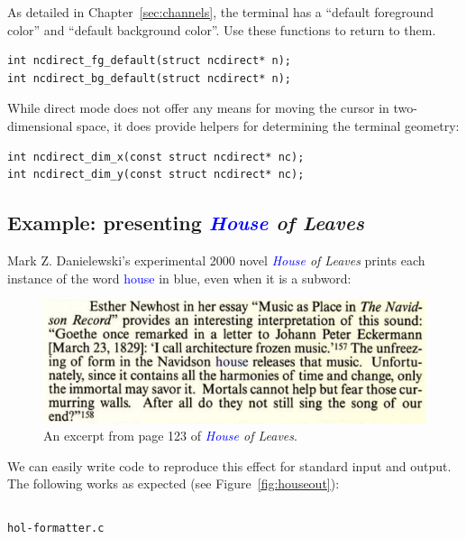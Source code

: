 \documentclass[letterpaper,10pt]{article}
\begin{document}
As detailed in Chapter~\ref{sec:channels}, the terminal has a ``default foreground color''
and ``default background color''. Use these functions to return to them.

\begin{listing}[!htbp]
\begin{verbatim}
int ncdirect_fg_default(struct ncdirect* n);
int ncdirect_bg_default(struct ncdirect* n);
\end{verbatim}
\end{listing}

While direct mode does not offer any means for moving the cursor in
two-dimensional space, it does provide helpers for determining the terminal
geometry:

\begin{listing}[!htbp]
\begin{verbatim}
int ncdirect_dim_x(const struct ncdirect* nc);
int ncdirect_dim_y(const struct ncdirect* nc);
\end{verbatim}
\end{listing}

\subsection{Example: presenting \textit{\textcolor{blue}{House} of Leaves}}

Mark Z. Danielewski's experimental 2000 novel \textit{\textcolor{blue}{House} of Leaves}\cite{danielewski2000house} prints each
instance of the word \textcolor{blue}{house} in blue, even when it is a subword:

\begin{figure}[!htbp]
\centering \includegraphics[width=.5\linewidth]{house-blue.png}
\caption{An excerpt from page 123 of \textit{\textcolor{blue}{House} of Leaves}.}
\label{fig:houseofleaves}
\end{figure}

We can easily write code to reproduce this effect for standard input and output.
The following works as expected (see Figure~\ref{fig:houseout}):

\begin{listing}[!htbp]
\inputminted[]{C}{code/hol-formatter.c}
\caption{\texttt{hol-formatter.c}}
\end{listing}
\end{document}

